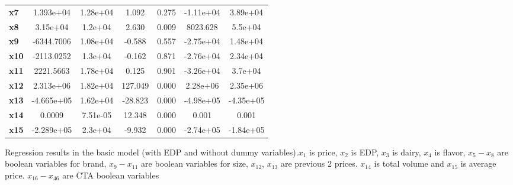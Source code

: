 \documentclass{article}
\begin{document}
\begin{center}
{\begin{tabular}{lcccccc}
\textbf{x7}    &    1.393e+04  &     1.28e+04     &     1.092  &         0.275        &    -1.11e+04    &     3.89e+04     \\
\textbf{x8}    &     3.15e+04  &      1.2e+04     &     2.630  &         0.009        &     8023.628    &      5.5e+04     \\
\textbf{x9}    &   -6344.7006  &     1.08e+04     &    -0.588  &         0.557        &    -2.75e+04    &     1.48e+04     \\
\textbf{x10}   &   -2113.0252  &      1.3e+04     &    -0.162  &         0.871        &    -2.76e+04    &     2.34e+04     \\
\textbf{x11}   &    2221.5663  &     1.78e+04     &     0.125  &         0.901        &    -3.26e+04    &      3.7e+04     \\
\textbf{x12}   &    2.313e+06  &     1.82e+04     &   127.049  &         0.000        &     2.28e+06    &     2.35e+06     \\
\textbf{x13}   &   -4.665e+05  &     1.62e+04     &   -28.823  &         0.000        &    -4.98e+05    &    -4.35e+05     \\
\textbf{x14}   &       0.0009  &     7.51e-05     &    12.348  &         0.000        &        0.001    &        0.001     \\
\textbf{x15}   &   -2.289e+05  &      2.3e+04     &    -9.932  &         0.000        &    -2.74e+05    &    -1.84e+05     \\
\bottomrule
\end{tabular}}
\caption{Regression results in the basic model (with EDP and without dummy variables).$x_1$ is price, $x_2$ is EDP, $x_3$ is dairy, $x_4$ is flavor, $x_5-x_8$ are boolean variables for brand, $x_9-x_{11}$ are boolean variables for size, $x_{12}$, $x_{13}$ are previous 2 prices. $x_{14}$ is total volume and $x_{15}$ is average price. $x_{16}-x_{46}$ are CTA boolean variables}
\end{center}
\end{document}
